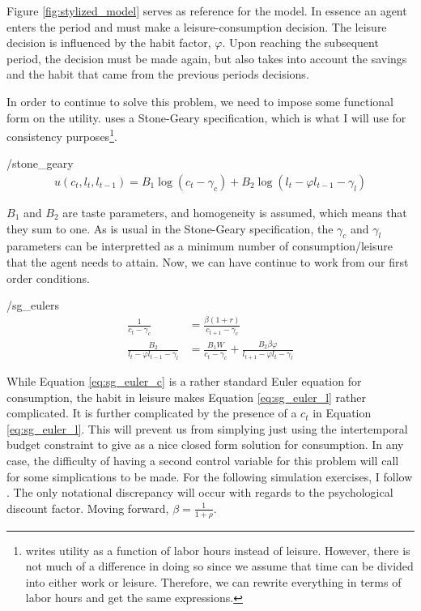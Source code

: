 \documentclass[ProjectMMD]{subfiles}
\begin{document}
\providecommand{\figName}{stylized_model} %
\providecommand{\figFile}{\figName} %
\hypertarget{\figFile}{}
Figure \ref{fig:stylized_model} serves as reference for the model. In essence an agent enters the period and must make a leisure-consumption decision. The leisure decision is influenced by the habit factor, $\varphi$. Upon reaching the subsequent period, the decision must be made again, but also takes into account the savings and the habit that came from the previous periods decisions.

In order to continue to solve this problem, we need to impose some functional form on the utility. \cite{bover1991relaxing} uses a Stone-Geary specification, which is what I will use for consistency purposes\footnote{\cite{bover1991relaxing} writes utility as a function of labor hours instead of leisure. However, there is not much of a difference in doing so since we assume that time can be divided into either work or leisure. Therefore, we can rewrite everything in terms of labor hours and get the same expressions.}.
\begin{verbatimwrite}{\EqDir/stone_geary}
  \begin{align}
    u(c_t, l_t, l_{t-1}) = B_1 \log \left(c_t - \gamma_c \right) + B_2 \log \left(l_t - \varphi l_{t-1} - \gamma_l \right) \label{eq:sg}
  \end{align}
\end{verbatimwrite}

$B_1$ and $B_2$ are taste parameters, and homogeneity is assumed, which means that they sum to one. As is usual in the Stone-Geary specification, the $\gamma_c$ and $\gamma_l$ parameters can be interpretted as a minimum number of consumption/leisure that the agent needs to attain. Now, we can have continue to work from our first order conditions.

\begin{verbatimwrite}{\EqDir/sg_eulers}
  \begin{align}
    \frac{1}{c_t -\gamma_c} &=\frac{\beta(1+r)}{c_{t+1}-\gamma_c} \label{eq:sg_euler_c} \\
    \frac{B_2}{l_t - \varphi l_{t-1} - \gamma_l} &= \frac{B_1 W}{c_t - \gamma_c} + \frac{B_2 \beta \varphi}{l_{t+1}-\varphi l_t - \gamma_l} \label{eq:sg_euler_l}
  \end{align}
\end{verbatimwrite}

While Equation \eqref{eq:sg_euler_c} is a rather standard Euler equation for consumption, the habit in leisure makes Equation \eqref{eq:sg_euler_l} rather complicated. It is further complicated by the presence of a $c_t$ in Equation \eqref{eq:sg_euler_l}. This will prevent us from simplying just using the intertemporal budget constraint to give as a nice closed form solution for consumption. In any case, the difficulty of having a second control variable for this problem will call for some simplications to be made. For the following simulation exercises, I follow \cite{bover1991relaxing}. The only notational discrepancy will occur with regards to the psychological discount factor. Moving forward, $\beta=\frac{1}{1+\rho}$. 
\hypertarget{Simulations}{}
\end{document}
